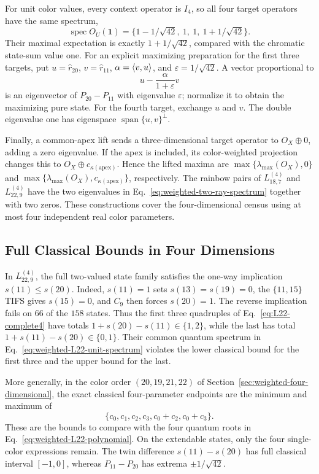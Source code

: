 \documentclass[aps,pra,reprint,superscriptaddress,longbibliography,nofootinbib,floatfix,10pt]{revtex4-2}
\theoremstyle{definition}\newtheorem{definition}[theorem]{Definition}
\theoremstyle{remark}\newtheorem{remark}[theorem]{Remark}
\begin{document}
For unit color values, every context operator is $I_4$, so all four target operators have the same spectrum,
\begin{equation}\label{eq:weighted-L22-unit-spectrum}
\operatorname{spec}O_U(\mathbf1)
=\{1-1/\sqrt{42},\ 1,\ 1,\ 1+1/\sqrt{42}\}.
\end{equation}
Their maximal expectation is exactly $1+1/\sqrt{42}$, compared with the chromatic state-sum value one. For an explicit maximizing preparation for the first three targets, put $u=\hat r_{20}$, $v=\hat r_{11}$, $\alpha=\langle v,u\rangle$, and $\varepsilon=1/\sqrt{42}$. A vector proportional to
\[
u-\frac{\alpha}{1+\varepsilon}v
\]
is an eigenvector of $P_{20}-P_{11}$ with eigenvalue $\varepsilon$; normalize it to obtain the maximizing pure state. For the fourth target, exchange $u$ and $v$. The double eigenvalue one has eigenspace $\operatorname{span}\{u,v\}^{\perp}$.

Finally, a common-apex lift sends a three-dimensional target operator to $O_X\oplus0$, adding a zero eigenvalue. If the apex is included, its color-weighted projection changes this to $O_X\oplus c_{\kappa(\mathrm{apex})}$. Hence the lifted maxima are $\max\{\lambda_{\max}(O_X),0\}$ and $\max\{\lambda_{\max}(O_X),c_{\kappa(\mathrm{apex})}\}$, respectively. The rainbow pairs of $L_{18,7}^{(4)}$ and $L_{22,9}^{(4)}$ have the two eigenvalues in Eq.~\eqref{eq:weighted-two-ray-spectrum} together with two zeros. These constructions cover the four-dimensional census using at most four independent real color parameters.

\subsection{Full Classical Bounds in Four Dimensions}\label{sec:classical-4d}

In $L_{22,9}^{(4)}$, the full two-valued state family satisfies the one-way implication $s(11)\le s(20)$. Indeed, $s(11)=1$ sets $s(13)=s(19)=0$, the $\{11,15\}$ TIFS gives $s(15)=0$, and $C_9$ then forces $s(20)=1$. The reverse implication fails on $66$ of the $158$ states. Thus the first three quadruples of Eq.~\eqref{eq:L22-complete4} have totals $1+s(20)-s(11)\in\{1,2\}$, while the last has total $1+s(11)-s(20)\in\{0,1\}$. Their common quantum spectrum in Eq.~\eqref{eq:weighted-L22-unit-spectrum} violates the lower classical bound for the first three and the upper bound for the last.

More generally, in the color order $(20,19,21,22)$ of Section~\ref{sec:weighted-four-dimensional}, the exact classical four-parameter endpoints are the minimum and maximum of
\begin{equation}\label{eq:classical-L22-envelope}
\{c_0,c_1,c_2,c_3,c_0+c_2,c_0+c_3\}.
\end{equation}
These are the bounds to compare with the four quantum roots in Eq.~\eqref{eq:weighted-L22-polynomial}. On the extendable states, only the four single-color expressions remain. The twin difference $s(11)-s(20)$ has full classical interval $[-1,0]$, whereas $P_{11}-P_{20}$ has extrema $\pm1/\sqrt{42}$.
\end{document}
